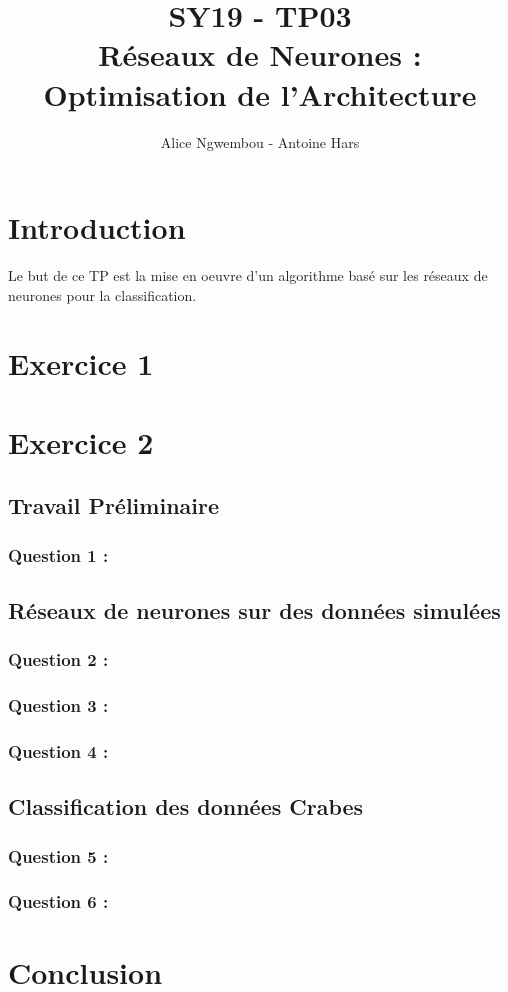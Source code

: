 \documentclass[a4paper, 10pt]{article}
\title{SY19 - TP03\\Réseaux de Neurones : Optimisation de l'Architecture}
\author{Alice Ngwembou - Antoine Hars}
\begin{document}
\maketitle

\section*{Introduction}
Le but de ce TP est la mise en oeuvre d'un algorithme basé sur les réseaux de neurones pour la classification.

\section*{Exercice 1}

\section*{Exercice 2}

\subsection*{Travail Préliminaire}

\subsubsection*{Question 1 :}

\subsection*{Réseaux de neurones sur des données simulées}

\subsubsection*{Question 2 :}

\subsubsection*{Question 3 :}

\subsubsection*{Question 4 :}

\subsection*{Classification des données Crabes}

\subsubsection*{Question 5 :}

\subsubsection*{Question 6 :}

\section*{Conclusion}
\end{document}
